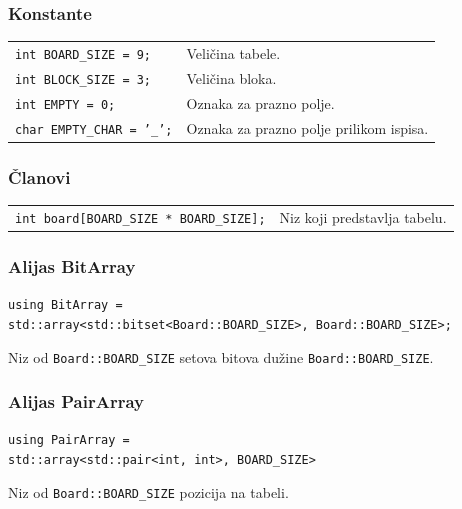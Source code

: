 \documentclass[a4paper]{article}
\begin{document}
    \subsubsection{Konstante}
    \begin{tabular}{ l l }
        \par\texttt{int BOARD\_SIZE = 9;} & Veličina tabele. \\
        \par\texttt{int BLOCK\_SIZE = 3;} & Veličina bloka. \\
        \par\texttt{int EMPTY = 0;}  & Oznaka za prazno polje. \\
        \par\texttt{char EMPTY\_CHAR = '\_';}  & Oznaka za prazno polje prilikom ispisa.
    \end{tabular}
    
    \subsubsection{Članovi}
    \begin{tabular}{ l l }
        \par\texttt{int board[BOARD\_SIZE * BOARD\_SIZE];} & Niz koji predstavlja tabelu.\\
    \end{tabular}

    \subsubsection{Alijas BitArray}
    \texttt{using BitArray = }\\
    \texttt{std::array<std::bitset<Board::BOARD\_SIZE>, Board::BOARD\_SIZE>;}
    \par Niz od \texttt{Board::BOARD\_SIZE} setova bitova dužine \texttt{Board::BOARD\_SIZE}.

    \subsubsection{Alijas PairArray}
    \texttt{using PairArray = }\\ 
    \texttt{std::array<std::pair<int, int>, BOARD\_SIZE>}
    \par Niz od \texttt{Board::BOARD\_SIZE} pozicija na tabeli.
    
\end{document}
